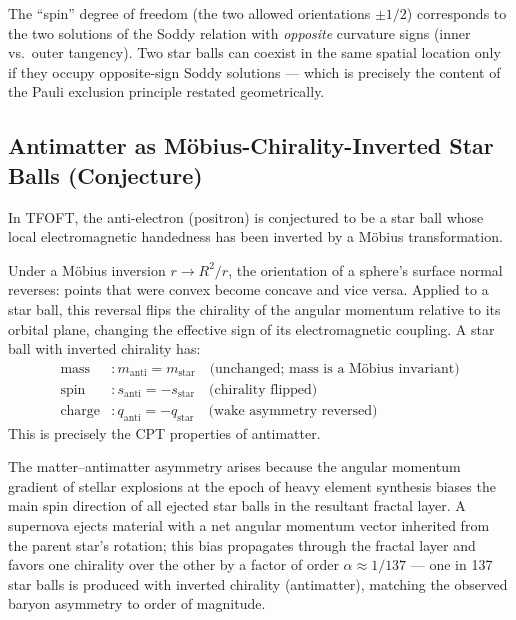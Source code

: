   The ``spin'' degree of freedom (the two allowed orientations $\pm 1/2$) corresponds
  to the two solutions of the Soddy relation with \emph{opposite} curvature signs
  (inner vs.\ outer tangency). Two star balls can coexist in the same spatial
  location only if they occupy opposite-sign Soddy solutions --- which is precisely
  the content of the Pauli exclusion principle restated geometrically.



\subsection{Antimatter as Möbius-Chirality-Inverted Star Balls (Conjecture)}

  In TFOFT, the anti-electron (positron) is conjectured to be a star ball whose
  local electromagnetic handedness has been inverted by a Möbius transformation.

  Under a Möbius inversion $r \to R^2/r$, the orientation of a sphere's surface
  normal reverses: points that were convex become concave and vice versa. Applied
  to a star ball, this reversal flips the chirality of the angular momentum
  relative to its orbital plane, changing the effective sign of its electromagnetic
  coupling. A star ball with inverted chirality has:
  \begin{align}
    \text{mass} &: m_{\text{anti}} = m_{\text{star}} \quad \text{(unchanged; mass is a Möbius invariant)}\\
    \text{spin} &: s_{\text{anti}} = -s_{\text{star}} \quad \text{(chirality flipped)}\\
    \text{charge} &: q_{\text{anti}} = -q_{\text{star}} \quad \text{(wake asymmetry reversed)}
  \end{align}
  This is precisely the CPT properties of antimatter.

  The matter--antimatter asymmetry arises because the angular momentum gradient of
  stellar explosions at the epoch of heavy element synthesis biases the main spin
  direction of all ejected star balls in the resultant fractal layer. A supernova
  ejects material with a net angular momentum vector inherited from the parent
  star's rotation; this bias propagates through the fractal layer and favors one
  chirality over the other by a factor of order $\alpha \approx 1/137$ --- one
  in 137 star balls is produced with inverted chirality (antimatter), matching
  the observed baryon asymmetry to order of magnitude.


